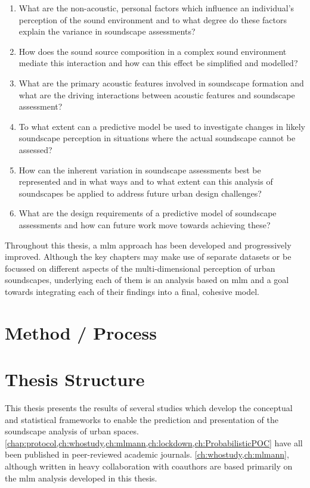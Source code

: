\begin{enumerate}
  \item What are the non-acoustic, personal factors which influence an individual's perception of the sound environment and to what degree do these factors explain the variance in soundscape assessments? 
  \item How does the sound source composition in a complex sound environment mediate this interaction and how can this effect be simplified and modelled? 
  \item What are the primary acoustic features involved in soundscape formation and what are the driving interactions between acoustic features and soundscape assessment?
  \item To what extent can a predictive model be used to investigate changes in likely soundscape perception in situations where the actual soundscape cannot be assessed? 
  \item How can the inherent variation in soundscape assessments best be represented and in what ways and to what extent can this analysis of soundscapes be applied to address future urban design challenges? 
  \item What are the design requirements of a predictive model of soundscape assessments and how can future work move towards achieving these?
\end{enumerate}

Throughout this thesis, a \gls{mlm} approach has been developed and progressively improved. Although the key chapters may make use of separate datasets or be focussed on different aspects of the multi-dimensional perception of urban soundscapes, underlying each of them is an analysis based on \gls{mlm} and a goal towards integrating each of their findings into a final, cohesive model.

\section{Method / Process}

\section{Thesis Structure}

This thesis presents the results of several studies which develop the conceptual and statistical frameworks to enable the prediction and presentation of the soundscape analysis of urban spaces. \cref{chap:protocol,ch:whostudy,ch:mlmann,ch:lockdown,ch:ProbabilisticPOC} have all been published in peer-reviewed academic journals. \cref{ch:whostudy,ch:mlmann}, although written in heavy collaboration with coauthors are based primarily on the \gls{mlm} analysis developed in this thesis.

